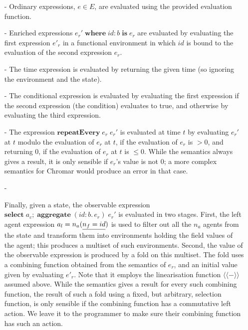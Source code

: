 \begin{itemize}

\item[-] Ordinary expressions, $e \in E$, are evaluated using the provided evaluation function. 

\item[-] Enriched expressions $e_r' \; \mathbf{where} \; id:b \; \mathbf{is} \; e_r$
are evaluated by evaluating the first expression $e'_r$ in a functional environment in which $id$ is bound to the evaluation of the second expression $e_r$.

\item[-] The time expression is evaluated by returning the given time (so ignoring the environment and the state).

\item[-] The conditional expression is evaluated by evaluating the first expression if the second expression (the condition) evaluates to true, and otherwise  by evaluating the third expression. 

\item[-] The expression $\mathbf{repeatEvery} \; e_r \; e_r'$ is evaluated at time
  $t$ by evaluating $e_r'$ at $t$ modulo the evaluation of $e_r$ at $t$, if the
  evaluation of $e_r$ is $>0$, and returning $0$, if the evaluation of $e_r$ at
  $t$ is $\leq 0$. While the semantics always gives a result, it is only sensible
  if $e_r$'s value is not $0$; a more complex semantics for Chromar would produce
  an error in that case.

\item[-] 

  Finally, given a state, the observable expression
  $\mathbf{select} \; a_c; \; \mathbf{aggregate} \; (id:b.\,e_r) \; e_r'$ is
  evaluated in two stages.  First, the left agent expression
  $a_l = n_a(\underline{n_f = id})$ is used to filter out all the $n_a$ agents from the
  state and transform them into environments holding the field values of the
  agent; this produces a multiset of such environments. Second, the value of the
  observable expression is produced by a fold on this multiset. The fold uses a
  combining function obtained from the semantics of $e_r$, and an initial value
  given by evaluating $e'_r$. Note that it employs the linearisation function
  $\langle\!\langle - \rangle\!\rangle$ assumed above. While the semantics gives a result for every such
  combining function, the result of such a fold using a fixed, but arbitrary,
  selection function, is only sensible if the combining function has a
  commutative left action. We leave it to the programmer to make sure their
  combining function has such an action.
\end{itemize}


